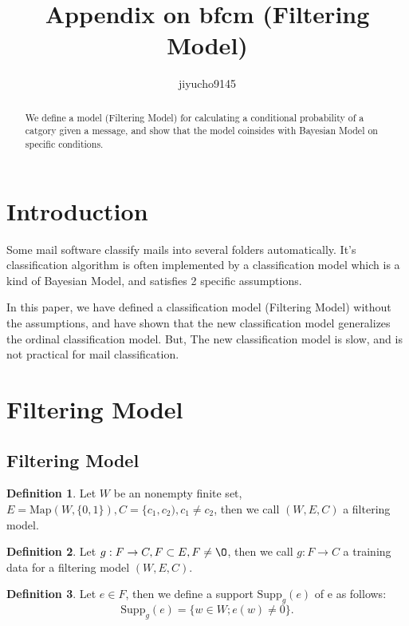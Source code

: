 \documentclass[11pt, a4paper]{article}
\theoremstyle{definition}
\newtheorem{definition}{Definition}[section]
\begin{document}
\title{Appendix on bfcm (Filtering Model)}
\author{jiyucho9145}
\maketitle
\begin{abstract}
We define a model (Filtering Model) for calculating a conditional probability of a catgory given a message,
and show that the model coinsides with Bayesian Model on specific conditions.
\end{abstract}

\newpage
\tableofcontents

\newpage
\section{Introduction}

Some mail software classify mails into several folders automatically.
It's classification algorithm is often implemented by a classification model which is a kind of Bayesian Model,
and satisfies 2 specific assumptions.

In this paper, we have defined a classification model (Filtering Model) without the assumptions,
and have shown that the new classification model generalizes the ordinal classification model.
But, The new classification model is slow, and is not practical for mail classification.

\section{Filtering Model}

\subsection{Filtering Model}

\begin{definition}
Let $ W $ be an nonempty finite set, $ E = \mathrm{Map}(W, \{0, 1\}), C = \{c_{1}, c_{2}), c_{1} \ne c_{2} $,
then we call $ (W, E, C) $ a filtering model.
\end{definition}

\begin{definition}
Let $ g : F \to C, F \subset E, F \ne \O $, then we call $ g : F \to C $ a training data for a filtering model $ (W, E, C) $.
\end{definition}

\begin{definition}
Let $ e \in F $, then we define a support $ \mathrm{Supp}_{g}(e) $ of e as follows:
\begin{equation}
\mathrm{Supp}_{g}(e) = \{ w \in W ; e(w) \ne 0\}.
\end{equation}
\end{definition}
\end{document}

